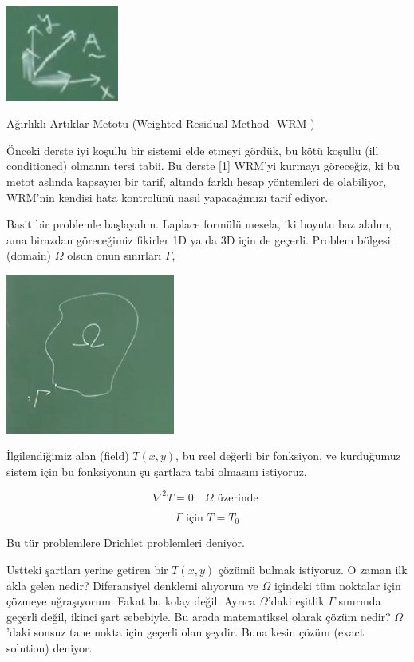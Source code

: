 \documentclass[12pt,fleqn]{article}\usepackage{../../common}
\begin{document}
\includegraphics[width=10em]{compscieng_app45aerofem1_03.png}


Ağırlıklı Artıklar Metotu (Weighted Residual Method -WRM-)

Önceki derste iyi koşullu bir sistemi elde etmeyi gördük, bu kötü koşullu (ill
conditioned) olmanın tersi tabii. Bu derste [1] WRM'yi kurmayı göreceğiz, ki bu
metot aslında kapsayıcı bir tarif, altında farklı hesap yöntemleri de
olabiliyor, WRM'nin kendisi hata kontrolünü nasıl yapacağımızı tarif ediyor.

Basit bir problemle başlayalım. Laplace formülü mesela, iki boyutu baz alalım,
ama birazdan göreceğimiz fikirler 1D ya da 3D için de geçerli. Problem bölgesi
(domain) $\Omega$ olsun onun sınırları $\Gamma$, 

\includegraphics[width=15em]{compscieng_app45aerofem1_01.png}

İlgilendiğimiz alan (field) $T(x,y)$, bu reel değerli bir fonksiyon, ve
kurduğumuz sistem için bu fonksiyonun şu şartlara tabi olmasını istiyoruz,

$$
\nabla^2 T = 0 \quad \Omega \textrm{ üzerinde } 
$$

$$
\Gamma \textrm{ için } T = T_0
$$

Bu tür problemlere Drichlet problemleri deniyor.

Üstteki şartları yerine getiren bir $T(x,y)$ çözümü bulmak istiyoruz. O zaman
ilk akla gelen nedir? Diferansiyel denklemi alıyorum ve $\Omega$ içindeki tüm
noktalar için çözmeye uğraşıyorum. Fakat bu kolay değil. Ayrıca $\Omega$'daki
eşitlik $\Gamma$ sınırında geçerli değil, ikinci şart sebebiyle. Bu arada
matematiksel olarak çözüm nedir? $\Omega$'daki sonsuz tane nokta için geçerli
olan şeydir. Buna kesin çözüm (exact solution) deniyor. 
\end{document}
